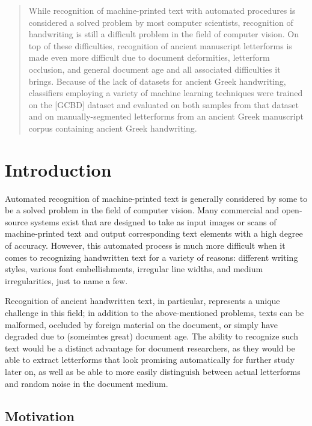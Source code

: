 \documentclass[10pt,twocolumn,letterpaper]{article}
\begin{document}
\begin{abstract}
    While recognition of machine-printed text with automated procedures is considered a solved problem by most computer scientists, recognition of handwriting is still a difficult problem in the field of computer vision. On top of these difficulties, recognition of ancient manuscript letterforms is made even more difficult due to document deformities, letterform occlusion, and general document age and all associated difficulties it brings. Because of the lack of datasets for ancient Greek handwriting, classifiers employing a variety of machine learning techniques were trained on the [GCBD] dataset and evaluated on both samples from that dataset and on manually-segmented letterforms from an ancient Greek manuscript corpus containing ancient Greek handwriting.
\end{abstract}

\section{Introduction}

Automated recognition of machine-printed text is generally considered by some to be a solved problem in the field of computer vision. Many commercial and open-source systems exist that are designed to take as input images or scans of machine-printed text and output corresponding text elements with a high degree of accuracy. However, this automated process is much more difficult when it comes to recognizing handwritten text for a variety of reasons: different writing styles, various font embellishments, irregular line widths, and medium irregularities, just to name a few.

Recognition of ancient handwritten text, in particular, represents a unique challenge in this field; in addition to the above-mentioned problems, texts can be malformed, occluded by foreign material on the document, or simply have degraded due to (someimtes great) document age. The ability to recognize such text would be a distinct advantage for document researchers, as they would be able to extract letterforms that look promising automatically for further study later on, as well as be able to more easily distinguish between actual letterforms and random noise in the document medium.

\subsection{Motivation}
\end{document}
